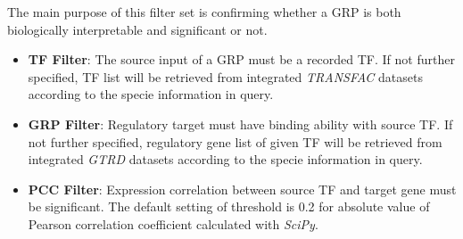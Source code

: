 \documentclass[fleqn,10pt]{wlscirep}
\begin{document}
\begin{enumerate}
The main purpose of this filter set is confirming whether a GRP is both biologically interpretable and significant or not.
\begin{itemize}
\setlength\itemsep{0em}
\item \textbf{TF Filter}: The source input of a GRP must be a recorded TF.
If not further specified, TF list will be retrieved from integrated \emph{TRANSFAC}\cite{transfac} datasets according to the specie information in query.
\item \textbf{GRP Filter}: Regulatory target must have binding ability with source TF. If not further specified, regulatory gene list of given TF will be retrieved from integrated \emph{GTRD}\cite{gkaa1057} datasets according to the specie information in query.
\item \textbf{PCC Filter}: Expression correlation between source TF and target gene must be significant. The default setting of threshold is 0.2 for absolute value of Pearson correlation coefficient calculated with \emph{SciPy}\cite{2020SciPy-NMeth}.
\end{itemize}
\end{enumerate}

\end{document}
